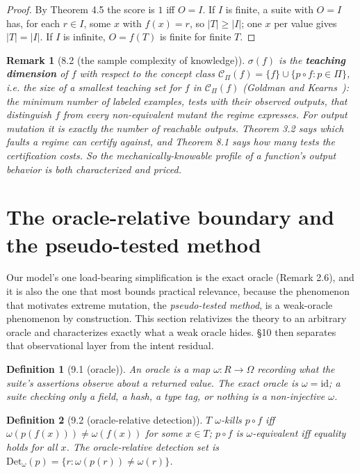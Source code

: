 \documentclass[conference]{IEEEtran}
\newcommand{\Det}{\mathrm{Det}}
\theoremstyle{run}
\newtheorem*{definition}{Definition}
\newtheorem*{remark}{Remark}
\begin{document}
\begin{proof}
By Theorem 4.5 the score is $1$ iff $O = I$. If $I$ is finite, a suite with $O = I$ has, for each $r \in I$, some $x$ with $f(x) = r$, so $|T| \ge |I|$; one $x$ per value gives $|T| = |I|$. If $I$ is infinite, $O = f(T)$ is finite for finite $T$.
\end{proof}

\begin{remark}[8.2 (the sample complexity of knowledge)]
$\sigma(f)$ is the \textbf{teaching dimension} of $f$ with respect to the concept class $\mathcal{C}_\Pi(f) = \{f\} \cup \{p \circ f : p \in \Pi\}$, i.e. the size of a smallest teaching set for $f$ in $\mathcal{C}_\Pi(f)$ (Goldman and Kearns~\cite{goldman1995}): the minimum number of labeled examples, tests with their observed outputs, that distinguish $f$ from every non-equivalent mutant the regime expresses. For output mutation it is exactly the number of reachable outputs. Theorem 3.2 says \emph{which} faults a regime can certify against, and Theorem 8.1 says \emph{how many tests} the certification costs. So the mechanically-knowable profile of a function's output behavior is both characterized and \emph{priced}.
\end{remark}

\setcounter{section}{8}
\section{The oracle-relative boundary and the pseudo-tested method}
Our model's one load-bearing simplification is the exact oracle (Remark 2.6), and it is also the one that most bounds practical relevance, because the phenomenon that motivates extreme mutation, the \emph{pseudo-tested method}, is a weak-oracle phenomenon by construction. This section relativizes the theory to an arbitrary oracle and characterizes exactly what a weak oracle hides. \S 10 then separates that observational layer from the intent residual.

\begin{definition}[9.1 (oracle)]
An \emph{oracle} is a map $\omega : R \to \Omega$ recording what the suite's assertions observe about a returned value. The exact oracle is $\omega = \mathrm{id}$; a suite checking only a field, a hash, a type tag, or nothing is a non-injective $\omega$.
\end{definition}

\begin{definition}[9.2 (oracle-relative detection)]
$T$ \emph{$\omega$-kills} $p\circ f$ iff $\omega(p(f(x))) \neq \omega(f(x))$ for some $x \in T$; $p\circ f$ is \emph{$\omega$-equivalent} iff equality holds for all $x$. The oracle-relative detection set is $\Det_\omega(p) = \{ r : \omega(p(r)) \neq \omega(r) \}$.
\end{definition}
\end{document}
